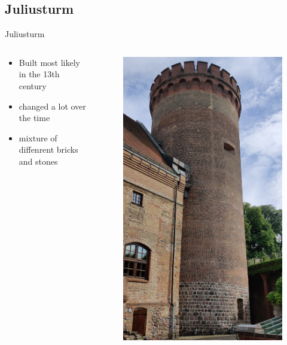 \documentclass[light]{lutbeamer} %
\begin{document}
\subsection{Juliusturm}
\begin{frame}{Juliusturm}
    \begin{columns}
    \begin{column}{0.5\textwidth}
            \begin{itemize}
                \item Built most likely in the 13th century \cite{JostRegina2010DZS-}
                \item changed a lot over the time
                \item mixture of diffenrent bricks and stones
            \end{itemize}
    \end{column}
    \begin{column}{0.5\textwidth}
        \begin{figure}
        \centering
            \vspace*{-1.25cm}
            \includegraphics[height=0.9\paperheight]{figures/juliusturm.jpg}

\end{figure}
\end{column}
\end{columns}
\end{frame}
\end{document}
